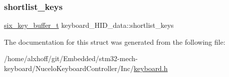 \subsubsection{\texorpdfstring{shortlist\+\_\+keys}{shortlist\_keys}}
{\footnotesize\ttfamily \hyperlink{keyboard_8h_ade7751d5843483b986b63a84a5ea6963}{six\+\_\+key\+\_\+buffer\+\_\+t} keyboard\+\_\+\+H\+I\+D\+\_\+data\+::shortlist\+\_\+keys}



The documentation for this struct was generated from the following file\+:\begin{DoxyCompactItemize}
\item 
/home/alxhoff/git/\+Embedded/stm32-\/mech-\/keyboard/\+Nucelo\+Keyboard\+Controller/\+Inc/\hyperlink{keyboard_8h}{keyboard.\+h}\end{DoxyCompactItemize}
